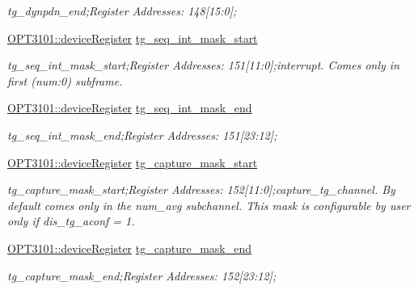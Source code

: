 \begin{DoxyCompactItemize}
\begin{DoxyCompactList}\small\item\em tg\+\_\+dynpdn\+\_\+end;Register Addresses\+: 148\mbox{[}15\+:0\mbox{]}; \end{DoxyCompactList}\item 
\mbox{\hyperlink{class_o_p_t3101_1_1device_register}{O\+P\+T3101\+::device\+Register}} \mbox{\hyperlink{class_o_p_t3101_1_1registers_a6a07f581e0aea372246d40ab03ef4b5d}{tg\+\_\+seq\+\_\+int\+\_\+mask\+\_\+start}}
\begin{DoxyCompactList}\small\item\em tg\+\_\+seq\+\_\+int\+\_\+mask\+\_\+start;Register Addresses\+: 151\mbox{[}11\+:0\mbox{]};interrupt. Comes only in first (num\+:0) subframe. \end{DoxyCompactList}\item 
\mbox{\hyperlink{class_o_p_t3101_1_1device_register}{O\+P\+T3101\+::device\+Register}} \mbox{\hyperlink{class_o_p_t3101_1_1registers_a362b1ed95fa8607822bec7117134619c}{tg\+\_\+seq\+\_\+int\+\_\+mask\+\_\+end}}
\begin{DoxyCompactList}\small\item\em tg\+\_\+seq\+\_\+int\+\_\+mask\+\_\+end;Register Addresses\+: 151\mbox{[}23\+:12\mbox{]}; \end{DoxyCompactList}\item 
\mbox{\hyperlink{class_o_p_t3101_1_1device_register}{O\+P\+T3101\+::device\+Register}} \mbox{\hyperlink{class_o_p_t3101_1_1registers_a943365fa49060742fa49602a1700821c}{tg\+\_\+capture\+\_\+mask\+\_\+start}}
\begin{DoxyCompactList}\small\item\em tg\+\_\+capture\+\_\+mask\+\_\+start;Register Addresses\+: 152\mbox{[}11\+:0\mbox{]};capture\+\_\+tg\+\_\+channel. By default comes only in the num\+\_\+avg subchannel. This mask is configurable by user only if dis\+\_\+tg\+\_\+aconf = \textquotesingle{}1\textquotesingle{}. \end{DoxyCompactList}\item 
\mbox{\hyperlink{class_o_p_t3101_1_1device_register}{O\+P\+T3101\+::device\+Register}} \mbox{\hyperlink{class_o_p_t3101_1_1registers_ade793e58a1728490c89346e2ecaf2914}{tg\+\_\+capture\+\_\+mask\+\_\+end}}
\begin{DoxyCompactList}\small\item\em tg\+\_\+capture\+\_\+mask\+\_\+end;Register Addresses\+: 152\mbox{[}23\+:12\mbox{]}; \end{DoxyCompactList}\item 

\end{DoxyCompactItemize}
